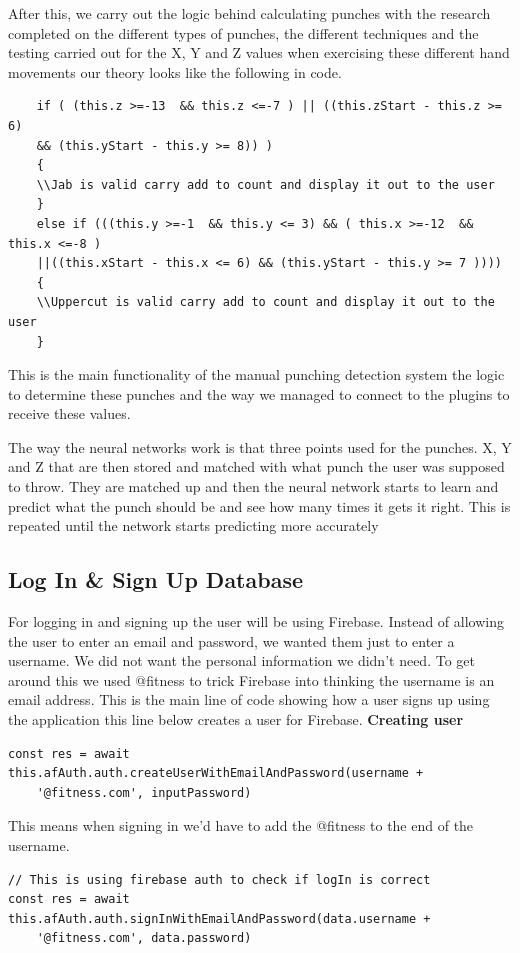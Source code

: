 \documentclass[a4paper,12pt]{report}
\begin{document}
After this, we carry out the logic behind calculating punches with the research completed on the different types of punches, the different techniques and the testing carried out for the X, Y and Z values when exercising these different hand movements our theory looks like the following in code.
\begin{verbatim}
    if ( (this.z >=-13  && this.z <=-7 ) || ((this.zStart - this.z >= 6) 
    && (this.yStart - this.y >= 8)) ) 
    {
    \\Jab is valid carry add to count and display it out to the user
    }
    else if (((this.y >=-1  && this.y <= 3) && ( this.x >=-12  && this.x <=-8 )
    ||((this.xStart - this.x <= 6) && (this.yStart - this.y >= 7 )))) 
    {
    \\Uppercut is valid carry add to count and display it out to the user
    }
\end{verbatim}
This is the main functionality of the manual punching detection system the logic to determine these punches and the way we managed to connect to the plugins to receive these values.

The way the neural networks work is that three points used for the punches. X, Y and Z that are then stored and matched with what punch the user was supposed to throw. They are matched up and then the neural network starts to learn and predict what the punch should be and see how many times it gets it right. This is repeated until the network starts predicting more accurately
\newpage
\subsection{Log In \& Sign Up Database}
For logging in and signing up the user will be using Firebase. Instead of allowing the user to enter an email and password, we wanted them just to enter a username. We did not want the personal information we didn't need. To get around this we used @fitness to trick Firebase into thinking the username is an email address. This is the main line of code showing how a user signs up using the application this line below creates a user for Firebase.
\newline
\textbf{ Creating user}
\begin{verbatim}
const res = await this.afAuth.auth.createUserWithEmailAndPassword(username +
    '@fitness.com', inputPassword)
\end{verbatim}

This means when signing in we'd have to add the @fitness to the end of the username. 
\begin{verbatim}
// This is using firebase auth to check if logIn is correct
const res = await this.afAuth.auth.signInWithEmailAndPassword(data.username +
    '@fitness.com', data.password)
\end{verbatim}
\end{document}
